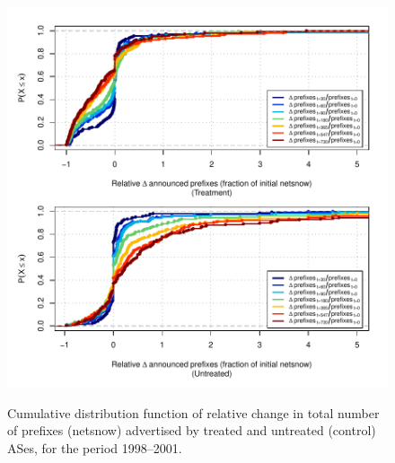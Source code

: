 \begin{figure}[H]
\begin{centering}
\begin{singlespace}
    \includegraphics[width=6in]{figures/behavior-rel_netsnow-1998_2001-corr.pdf}
    \vspace{-2em}\\
    \caption{Cumulative distribution function of relative change in total
    number of prefixes (netsnow) advertised by treated and untreated (control)
    ASes, for the period 1998--2001.}
\end{singlespace}
\end{centering}
\end{figure}
